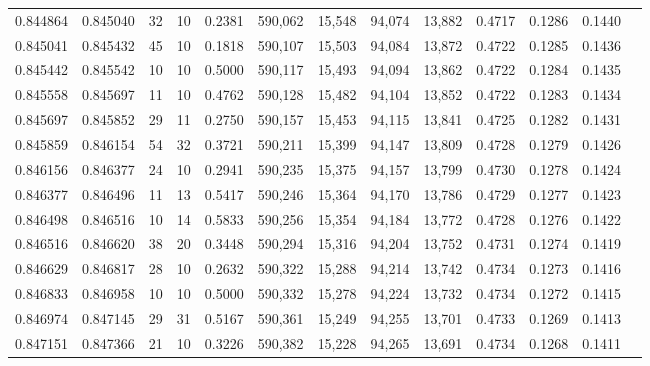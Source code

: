 \begin{tabular}{rrrrrrrrrrrrr}
0.844864 & 0.845040 &    32 &  10 &                                     0.2381 & 590,062 &  15,548 &  94,074 &  13,882 & 0.4717 & 0.1286 & 0.1440 \\
0.845041 & 0.845432 &    45 &  10 &                                     0.1818 & 590,107 &  15,503 &  94,084 &  13,872 & 0.4722 & 0.1285 & 0.1436 \\
0.845442 & 0.845542 &    10 &  10 &                                     0.5000 & 590,117 &  15,493 &  94,094 &  13,862 & 0.4722 & 0.1284 & 0.1435 \\
0.845558 & 0.845697 &    11 &  10 &                                     0.4762 & 590,128 &  15,482 &  94,104 &  13,852 & 0.4722 & 0.1283 & 0.1434 \\
0.845697 & 0.845852 &    29 &  11 &                                     0.2750 & 590,157 &  15,453 &  94,115 &  13,841 & 0.4725 & 0.1282 & 0.1431 \\
0.845859 & 0.846154 &    54 &  32 &                                     0.3721 & 590,211 &  15,399 &  94,147 &  13,809 & 0.4728 & 0.1279 & 0.1426 \\
0.846156 & 0.846377 &    24 &  10 &                                     0.2941 & 590,235 &  15,375 &  94,157 &  13,799 & 0.4730 & 0.1278 & 0.1424 \\
0.846377 & 0.846496 &    11 &  13 &                                     0.5417 & 590,246 &  15,364 &  94,170 &  13,786 & 0.4729 & 0.1277 & 0.1423 \\
0.846498 & 0.846516 &    10 &  14 &                                     0.5833 & 590,256 &  15,354 &  94,184 &  13,772 & 0.4728 & 0.1276 & 0.1422 \\
0.846516 & 0.846620 &    38 &  20 &                                     0.3448 & 590,294 &  15,316 &  94,204 &  13,752 & 0.4731 & 0.1274 & 0.1419 \\
0.846629 & 0.846817 &    28 &  10 &                                     0.2632 & 590,322 &  15,288 &  94,214 &  13,742 & 0.4734 & 0.1273 & 0.1416 \\
0.846833 & 0.846958 &    10 &  10 &                                     0.5000 & 590,332 &  15,278 &  94,224 &  13,732 & 0.4734 & 0.1272 & 0.1415 \\
0.846974 & 0.847145 &    29 &  31 &                                     0.5167 & 590,361 &  15,249 &  94,255 &  13,701 & 0.4733 & 0.1269 & 0.1413 \\
0.847151 & 0.847366 &    21 &  10 &                                     0.3226 & 590,382 &  15,228 &  94,265 &  13,691 & 0.4734 & 0.1268 & 0.1411 \\

\end{tabular}
